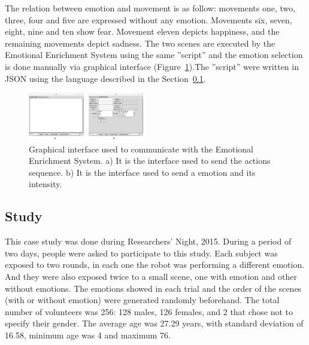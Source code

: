 The relation between emotion and movement is as follow: movements one, two, three, four and five are expressed without any emotion. Movements six, seven, eight, nine and ten show fear. Movement eleven depicts happiness, and the remaining movements depict sadness. The two scenes are executed by the Emotional Enrichment System using the same ''script'' and the emotion selection is done manually via graphical interface (Figure~\ref{fig:graphical_interface}).The ''script'' were written in JSON using the language described in the Section~\ref{}.

\begin{figure}
	\centering
	\includegraphics[width=0.45\textwidth]{./Images/InterfaceExperiment.png} 
	\caption{Graphical interface used to communicate with the Emotional Enrichment System. a) It is the interface used to send the actions sequence. b) It is the interface used to send a emotion and its intensity.}
	\label{fig:graphical_interface}
\end{figure}

\subsection{Study}

This case study was done during Researchers' Night, 2015. During a period of two days, people were asked to participate to this study. Each subject was exposed to two rounds, in each one the robot was performing a different emotion. And  they were also exposed twice to a small scene, one with emotion and other without emotions. The emotions showed in each trial and the order of the scenes (with or without emotion) were generated randomly beforehand. The total number of volunteers was 256: 128 males, 126 females, and 2 that chose not to specify their gender. The average age was 27.29 years, with standard deviation of 16.58, minimum age was 4 and maximum 76.
